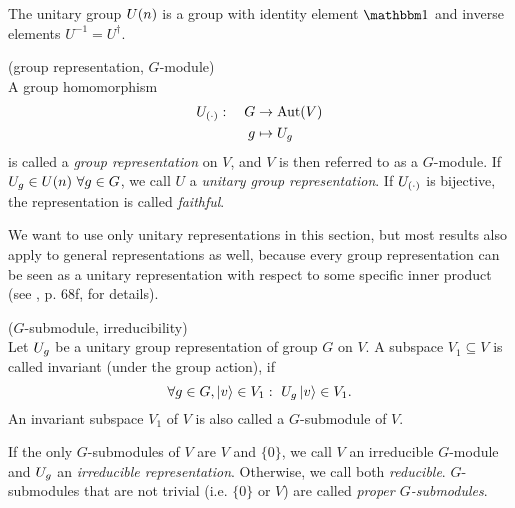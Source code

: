 \documentclass[a4paper,11pt, BCOR=4mm, DIV=12, pagesize]{scrartcl}
\begin{document}
\begin{example}
 The unitary group ${U(n)}$ is a group with identity element $\ind$ and 
inverse elements $U^{-1} = U^\dagger$.
\end{example}

\begin{definition}(group representation, $G$-module)\label{def:gmod}\\
 A group homomorphism
 \begin{align}\begin{split}
  U_{(\cdot)}:\quad G&\to \mathrm{Aut}(V)\\
  g&\mapsto U_{g}
  \end{split}
 \end{align}
 is called a \emph{group representation} on $V$, and $V$ is then referred to as 
a $G$-module. If $U_{g}\in{U(n)}\ \forall g\in G$, we call $U$ a 
\emph{unitary group representation}. If $U_{(\cdot)}$ is bijective, the 
representation is called \emph{faithful}.
\end{definition}

We want to use only unitary representations in this section, but most results 
also apply to general representations as well, because every group 
representation can be seen as a unitary representation with respect to some 
specific inner product (see \cite{rep}, p. 68f, for details).

\begin{definition}($G$-submodule, irreducibility)\label{def:irred}\\
 Let $U_{g}$ be a unitary group representation of group $G$ on $V$. A 
subspace $V_1\subseteq V$ is called invariant (under the group action), if 
\begin{equation}
 \forall g\in G, \ket{v}\in V_1:\ U_g\ket{v}\in V_1.
\end{equation}
An invariant subspace $V_1$ of $V$ is also called a $G$-submodule of $V$.

If the only $G$-submodules of $V$ are $V$ and $\{0\}$, we call $V$ an 
irreducible $G$-module and $U_{g}$ an \emph{irreducible representation}. 
Otherwise, we call both \emph{reducible}. $G$-submodules that are not trivial 
(i.e. $\{0\}$ or $V$) are called \emph{proper $G$-submodules}. 
\end{definition}
\end{document}
